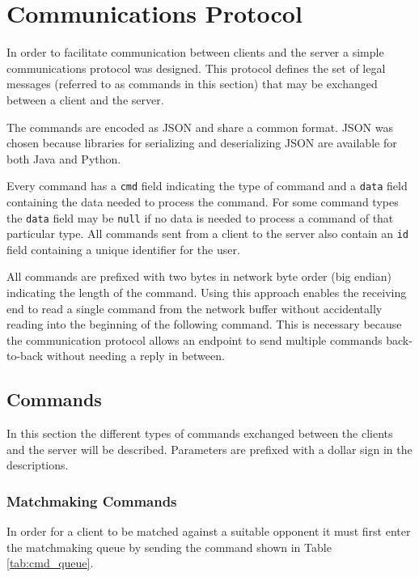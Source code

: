\section{Communications Protocol}
\label{sec:com_protocol}
In order to facilitate communication between clients and the server a simple communications protocol was designed.
This protocol defines the set of legal messages (referred to as commands in this section) that may be exchanged between a client and the server.

The commands are encoded as JSON and share a common format.
JSON was chosen because libraries for serializing and deserializing JSON are available for both Java and Python.

Every command has a \texttt{cmd} field indicating the type of command and a \texttt{data} field containing the data needed to process the command.
For some command types the \texttt{data} field may be \texttt{null} if no data is needed to process a command of that particular type.
All commands sent from a client to the server also contain an \texttt{id} field containing a unique identifier for the user.

All commands are prefixed with two bytes in network byte order (big endian) indicating the length of the command.
Using this approach enables the receiving end to read a single command from the network buffer without accidentally reading into the beginning of the following command.
This is necessary because the communication protocol allows an endpoint to send multiple commands back-to-back without needing a reply in between.

\subsection{Commands}
In this section the different types of commands exchanged between the clients and the server will be described.
Parameters are prefixed with a dollar sign in the descriptions.

\subsubsection{Matchmaking Commands}
In order for a client to be matched against a suitable opponent it must first enter the matchmaking queue by sending the command shown in Table \ref{tab:cmd_queue}.

\newenvironment{command}
{\bigskip\begin{minipage}{\textwidth}\hrule\begin{description}}
{\end{description}\hrule\end{minipage}\bigskip}

